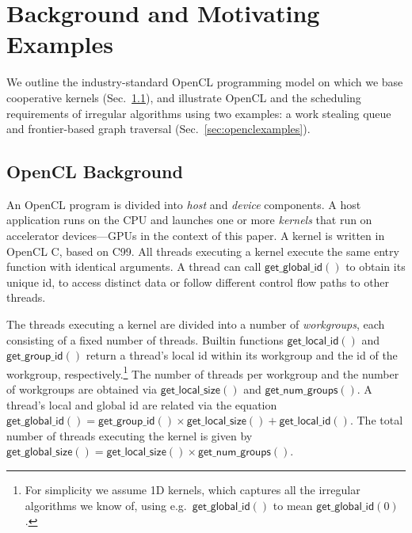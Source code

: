 \documentclass[numbers,nocopyrightspace,10pt]{sigplanconf}
\newcommand{\mysec}{Sec.~}
\newcommand{\getgroupid}{\mathsf{get\_group\_id}}
\newcommand{\getnumgroups}{\mathsf{get\_num\_groups}}
\newcommand{\getlocalid}{\mathsf{get\_local\_id}}
\newcommand{\getglobalid}{\mathsf{get\_global\_id}}
\newcommand{\getlocalsize}{\mathsf{get\_local\_size}}
\newcommand{\getglobalsize}{\mathsf{get\_global\_size}}
\begin{document}
\section{Background and Motivating Examples}\label{sec:background}

We outline the industry-standard OpenCL programming model on which we
base cooperative kernels (\mysec\ref{sec:opencl}), and illustrate
OpenCL and the scheduling requirements of irregular algorithms using two examples: a work stealing queue and frontier-based graph traversal
(\mysec\ref{sec:openclexamples}).

\subsection{OpenCL Background}\label{sec:opencl}



An OpenCL program is divided into \emph{host} and \emph{device}
components.  A host application runs on the CPU and launches one or
more \emph{kernels} that run on accelerator devices---GPUs in the
context of this paper.  A kernel is written in OpenCL C, based on C99.
All threads executing a kernel execute the same entry function with
identical arguments.  A thread can call $\getglobalid()$
to obtain its unique id, to access distinct data or follow different control flow paths to other threads.

The threads executing a kernel are divided into a number of \emph{workgroups}, each consisting of a fixed number of threads.  Builtin functions
$\getlocalid()$ and $\getgroupid()$ return a thread's local id within
its workgroup and the id of the workgroup, respectively.\footnote{For simplicity we assume 1D kernels, which captures all the
irregular algorithms we know of, using
e.g.\ $\getglobalid()$ to mean $\getglobalid(0)$.
}  The number
of threads per workgroup and the number of workgroups are obtained via
$\getlocalsize()$ and $\getnumgroups()$.  A thread's local and global
id are related via the equation $\getglobalid() = \getgroupid() \times
\getlocalsize() + \getlocalid()$.  The total number of threads executing the kernel is given by $\getglobalsize() = \getlocalsize()\times\getnumgroups()$.
\end{document}
